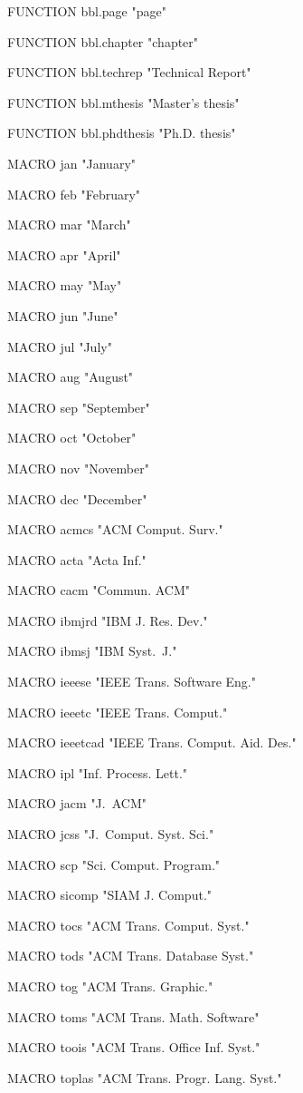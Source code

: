 FUNCTION {bbl.page}
{ "page" }

FUNCTION {bbl.chapter}
{ "chapter" }

FUNCTION {bbl.techrep}
{ "Technical Report" }

FUNCTION {bbl.mthesis}
{ "Master's thesis" }

FUNCTION {bbl.phdthesis}
{ "Ph.D. thesis" }

MACRO {jan} {"January"}

MACRO {feb} {"February"}

MACRO {mar} {"March"}

MACRO {apr} {"April"}

MACRO {may} {"May"}

MACRO {jun} {"June"}

MACRO {jul} {"July"}

MACRO {aug} {"August"}

MACRO {sep} {"September"}

MACRO {oct} {"October"}

MACRO {nov} {"November"}

MACRO {dec} {"December"}

MACRO {acmcs} {"ACM Comput. Surv."}

MACRO {acta} {"Acta Inf."}

MACRO {cacm} {"Commun. ACM"}

MACRO {ibmjrd} {"IBM J. Res. Dev."}

MACRO {ibmsj} {"IBM Syst.~J."}

MACRO {ieeese} {"IEEE Trans. Software Eng."}

MACRO {ieeetc} {"IEEE Trans. Comput."}

MACRO {ieeetcad}
 {"IEEE Trans. Comput. Aid. Des."}

MACRO {ipl} {"Inf. Process. Lett."}

MACRO {jacm} {"J.~ACM"}

MACRO {jcss} {"J.~Comput. Syst. Sci."}

MACRO {scp} {"Sci. Comput. Program."}

MACRO {sicomp} {"SIAM J. Comput."}

MACRO {tocs} {"ACM Trans. Comput. Syst."}

MACRO {tods} {"ACM Trans. Database Syst."}

MACRO {tog} {"ACM Trans. Graphic."}

MACRO {toms} {"ACM Trans. Math. Software"}

MACRO {toois} {"ACM Trans. Office Inf. Syst."}

MACRO {toplas} {"ACM Trans. Progr. Lang. Syst."}


